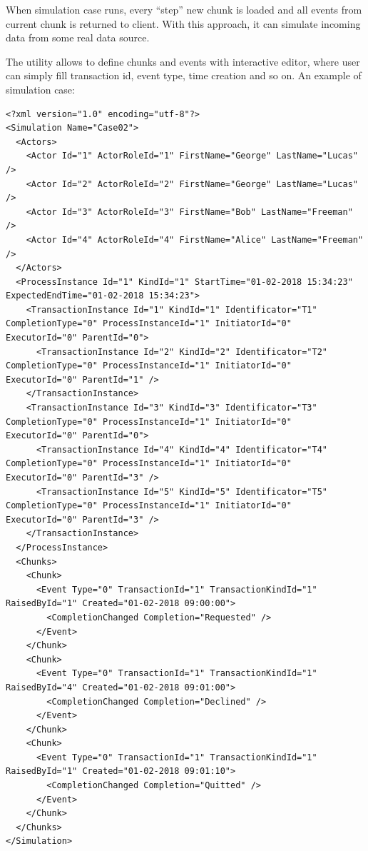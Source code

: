 When simulation case runs, every ``step'' new chunk is loaded and all events from current chunk is returned to client. With this approach, it can simulate incoming data from some real data source.

The utility allows to define chunks and events with interactive editor, where user can simply fill transaction id, event type, time creation and so on. An example of simulation case:

\begin{verbatim}
<?xml version="1.0" encoding="utf-8"?>
<Simulation Name="Case02">
  <Actors>
    <Actor Id="1" ActorRoleId="1" FirstName="George" LastName="Lucas" />
    <Actor Id="2" ActorRoleId="2" FirstName="George" LastName="Lucas" />
    <Actor Id="3" ActorRoleId="3" FirstName="Bob" LastName="Freeman" />
    <Actor Id="4" ActorRoleId="4" FirstName="Alice" LastName="Freeman" />
  </Actors>
  <ProcessInstance Id="1" KindId="1" StartTime="01-02-2018 15:34:23" ExpectedEndTime="01-02-2018 15:34:23">
    <TransactionInstance Id="1" KindId="1" Identificator="T1" CompletionType="0" ProcessInstanceId="1" InitiatorId="0" ExecutorId="0" ParentId="0">
      <TransactionInstance Id="2" KindId="2" Identificator="T2" CompletionType="0" ProcessInstanceId="1" InitiatorId="0" ExecutorId="0" ParentId="1" />
    </TransactionInstance>
    <TransactionInstance Id="3" KindId="3" Identificator="T3" CompletionType="0" ProcessInstanceId="1" InitiatorId="0" ExecutorId="0" ParentId="0">
      <TransactionInstance Id="4" KindId="4" Identificator="T4" CompletionType="0" ProcessInstanceId="1" InitiatorId="0" ExecutorId="0" ParentId="3" />
      <TransactionInstance Id="5" KindId="5" Identificator="T5" CompletionType="0" ProcessInstanceId="1" InitiatorId="0" ExecutorId="0" ParentId="3" />
    </TransactionInstance>
  </ProcessInstance>
  <Chunks>
    <Chunk>
      <Event Type="0" TransactionId="1" TransactionKindId="1" RaisedById="1" Created="01-02-2018 09:00:00">
        <CompletionChanged Completion="Requested" />
      </Event>
    </Chunk>
    <Chunk>
      <Event Type="0" TransactionId="1" TransactionKindId="1"  RaisedById="4" Created="01-02-2018 09:01:00">
        <CompletionChanged Completion="Declined" />
      </Event>
    </Chunk>
    <Chunk>
      <Event Type="0" TransactionId="1" TransactionKindId="1"  RaisedById="1" Created="01-02-2018 09:01:10">
        <CompletionChanged Completion="Quitted" />
      </Event>
    </Chunk>
  </Chunks>
</Simulation>
\end{verbatim}
